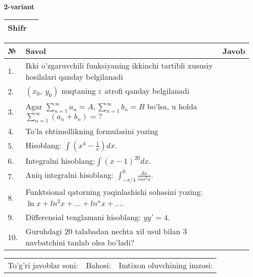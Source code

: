 \documentclass{article}
\begin{document}
  \egroup
  
  \newpage
  
  
  \textbf{2-variant}\\
  
  \bgroup
  \def\arraystretch{1.6} %
  
  \begin{tabular}{|m{5.7cm}|m{9.5cm}|}
  \hline
  Shifr & \\
  \hline
  \end{tabular}
  
  \vspace{1cm}
  
  \begin{tabular}{|m{0.7cm}|m{10cm}|m{4cm}|}
  \hline
  № & Savol & Javob \\
  \hline
  1. & Ikki o'zgaruvchili funksiyaning ikkinchi tartibli xususiy hosilalari qanday belgilanadi &  \\
  \hline
  2. & \((x_{0},\ y_{0})\) nuqtaning \(\varepsilon\) atrofi qanday belgilanadi &  \\
  \hline
  3. & Agar \(\sum_{n = 1}^{\infty}a_{n} = A,\sum_{n = 1}^{\infty}b_{n} = B\) bo'lsa, u holda \(\sum_{n = 1}^{\infty}\left( a_{n} + b_{n} \right) = ?\) &  \\
  \hline
  4. & To'la ehtimollikning formulasini yozing &  \\
  \hline
  5. & Hisoblang: \(\int \left( x^{4} - \frac{1}{x} \right)dx\). &  \\
  \hline
  6. & Integralni hisoblang:\(\int {(x - 1)^{20}}dx\). &  \\
  \hline
  7. & Aniq integralni hisoblang: \(\int_{- \pi/4}^{0}\frac{dx}{cos^{2}x}\). &  \\
  \hline
  8. & Funktsional qatorning yaqinlashishi sohasini yozing: \(\ln x + ln^{2}x + ... + ln^{n}x + ...\). &  \\
  \hline
  9. & Differensial tenglamani hisoblang: \(yy' = 4\). &  \\
  \hline
  10. & Guruhdagi 20 talabadan nechta xil usul bilan 3 navbatchini tanlab olsa bo'ladi? &  \\
  \hline
  \end{tabular}
  
  \vspace{1cm}
  
  \begin{tabular}{lll}
  To'g'ri javoblar soni: \underline{\hspace{1.5cm}} & 
  Bahosi: \underline{\hspace{1.5cm}} & 
  Imtixon oluvchining imzosi: \underline{\hspace{2cm}} \\
  \end{tabular}
  
\end{document}
